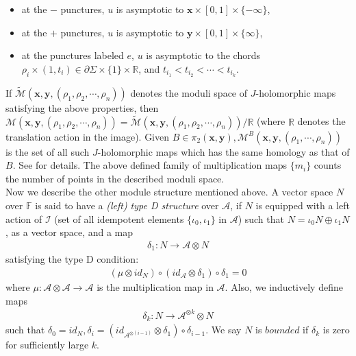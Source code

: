 \documentclass[11pt,reqno]{amsart}
\theoremstyle{definition}
\newtheorem *{remark}{Remark}
\begin{document}
\begin{itemize}
    \item at the $-$ punctures, $u$ is asymptotic to $\bm{x} \times [0,1] \times \{ -\infty\}$, 
    \item at the $+$ punctures, $u$ is asymptotic to $\bm{y} \times [0,1] \times \{ \infty\}$,
    \item at the punctures labeled $e$, $u$ is asymptotic to the chords $\rho_i \times (1,t_i) \in \partial \Sigma \times \{1\} \times \mathbb{R}$, and $t_{i_1}<t_{i_2}<\cdots<t_{i_k}$.
\end{itemize}

If $\widetilde{\mathcal{M}}(\bm{x},\bm{y},(\rho_1,\rho_2,\cdots,\rho_n))$ denotes the moduli space of $J$-holomorphic maps satisfying the above properties, then $\mathcal{M}(\bm{x},\bm{y},(\rho_1,\rho_2,\cdots,\rho_n)) =  {\widetilde{\mathcal{M}}(\bm{x},\bm{y},(\rho_1,\rho_2,\cdots,\rho_n))} / \mathbb{R} $ (where $\mathbb{R}$ denotes the translation action in the image). Given $B \in \pi_2(\bm{x},\bm{y}), \mathcal{M}^{B}(\bm{x},\bm{y},(\rho_1,\cdots,\rho_n))$ is the set of all such $J$-holomorphic maps which has the same homology as that of $B$. See \cite[Chapter 5]{lot08} for details. The above defined family of multiplication maps $\{m_i\}$ counts the number of points in the described moduli space. \\

Now we describe the other module structure mentioned above. A vector space $N$ over $\mathbb{F}$ is said to have a \emph{(left) type D structure} over $\mathcal{A}$, if $N$ is equipped with a left action of $\mathcal{I}$ (set of all idempotent elements $\{\iota_0, \iota_1 \}$ in $\mathcal{A}$) such that $N = \iota_0 N \oplus \iota_1 N$, as a vector space, and a map
\begin{align*}
    \delta_1 : N \rightarrow \mathcal{A} \otimes N 
\end{align*}
satisfying the type D condition:
\begin{align*}
    (\mu \otimes id_N) \circ (id_{\mathcal{A}} \otimes \delta_1) \circ \delta_1 = 0
\end{align*}
where $\mu: \mathcal{A}\otimes \mathcal{A} \rightarrow \mathcal{A}$ is the multiplication map in $\mathcal{A}$. Also, we inductively define maps 
\begin{gather*}
    \delta_k : N \rightarrow \mathcal{A}^{\otimes k} \otimes N
\end{gather*}
such that $\delta_0 = id_N, \delta_i = (id_{\mathcal{A}^{\otimes (i-1)}} \otimes \delta_1) \circ \delta_{i-1}$. We say $N$ is $bounded$ if $\delta_k$ is zero for sufficiently large $k$. \\
\end{document}
